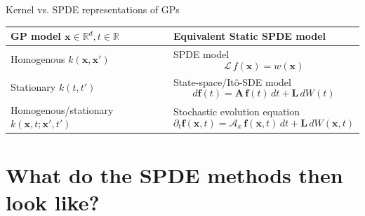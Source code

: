 \documentclass[first=dgreen,second=purple,presentation]{elecslides}
\begin{document}
\begin{frame}{Kernel vs. SPDE representations of GPs}

\begin{tabularx}{0.98\textwidth}{ | p{} | p{} | }
\hline
\cellcolor{blue!25}GP model $\mathbf{x} \in \mathbb{R}^d, t \in \mathbb{R}$ & \cellcolor{blue!25}Equivalent Static SPDE model \\
\hline
\hline
Homogenous $k(\mathbf{x},\mathbf{x}')$ &
SPDE model
\begin{equation}
  \mathcal{L} \, f(\mathbf{x}) = w(\mathbf{x})
\nonumber
\end{equation}
\\
\hline
Stationary $k(t,t')$ &
State-space/It\^o-SDE model 
\begin{equation}
d\mathbf{f}(t) = \mathbf{A} \, \mathbf{f}(t) \, dt + \mathbf{L} \, dW(t)
\nonumber
\end{equation}
\\
\hline
Homogenous/stationary $k(\mathbf{x},t;\mathbf{x}',t')$ & 
Stochastic evolution equation
\begin{equation}
\partial_t \mathbf{f}(\mathbf{x},t)
= \mathcal{A}_x \, \mathbf{f}(\mathbf{x},t) \, dt + \mathbf{L} \, dW(\mathbf{x},t)
\nonumber
\end{equation}
\\
\hline
\end{tabularx}

\end{frame}



\section{What do the SPDE methods then look like?}
\end{document}
